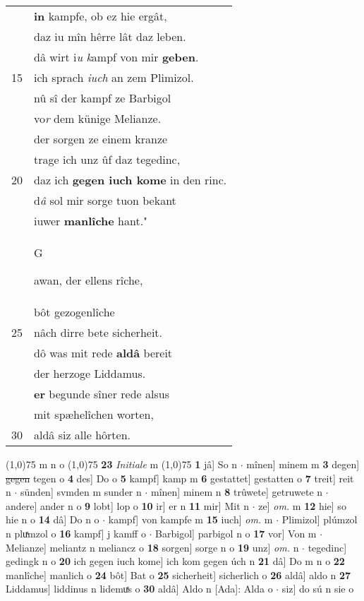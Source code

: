 \documentclass[8pt,a4paper,notitlepage]{article}
\begin{document}
\begin{table}[ht]
\begin{minipage}[t]{0.5\linewidth}
\begin{tabular}{rl}
 & \textbf{in} kampfe, ob ez  hie ergât,\\ 
 & daz iu mîn hêrre lât daz leben.\\ 
 & dâ wirt i\textit{u} \textit{k}ampf von mir \textbf{geben}.\\ 
15 & ich sprach \textit{iuch} an zem Plimizol.\\ 
 & nû sî der kampf ze Barbigol\\ 
 & vo\textit{r} dem künige Melianze.\\ 
 & der sorgen ze einem kranze\\ 
 & trage ich unz ûf daz tegedinc,\\ 
20 & daz ich \textbf{gegen iuch kome} in den rinc.\\ 
 & d\textit{â} sol mir sorge tuon bekant\\ 
 & iuwer \textbf{manlîche} hant."\\ 
 & \begin{large}G\end{large}awan, der ellens rîche,\\ 
 & bôt gezogenlîche\\ 
25 & nâch dirre bete sicherheit.\\ 
 & dô was mit rede \textbf{aldâ} bereit\\ 
 & der herzoge Liddamus.\\ 
 & \textbf{er} begunde sîner rede alsus\\ 
 & mit spæhelîchen worten,\\ 
30 & aldâ siz alle hôrten.\\ 
\end{tabular}
\scriptsize
\line(1,0){75} \newline
m n o \newline
\line(1,0){75} \newline
\textbf{23} \textit{Initiale} m  \newline
\line(1,0){75} \newline
\textbf{1} jâ] So n  $\cdot$ mînen] minem m \textbf{3} degen] \sout{gegen} tegen o \textbf{4} des] Do o \textbf{5} kampf] kamp m \textbf{6} gestattet] gestatten o \textbf{7} treit] reit n  $\cdot$ sünden] svmden m sunder n  $\cdot$ mînen] minem n \textbf{8} trûwete] getruwete n  $\cdot$ andere] ander n o \textbf{9} lobt] lop o \textbf{10} ir] er n \textbf{11} mir] Mit n  $\cdot$ ze] \textit{om.} m \textbf{12} hie] so hie n o \textbf{14} dâ] Do n o  $\cdot$ kampf] von kampfe m \textbf{15} iuch] \textit{om.} m  $\cdot$ Plimizol] plúmzol n pluͯmzol o \textbf{16} kampf] j kamff o  $\cdot$ Barbigol] parbigol n o \textbf{17} vor] Von m  $\cdot$ Melianze] meliantz n meliancz o \textbf{18} sorgen] sorge n o \textbf{19} unz] \textit{om.} n  $\cdot$ tegedinc] gedingk n o \textbf{20} ich gegen iuch kome] ich kom gegen úch n \textbf{21} dâ] Do m n o \textbf{22} manlîche] manlich o \textbf{24} bôt] Bat o \textbf{25} sicherheit] sicherlich o \textbf{26} aldâ] aldo n \textbf{27} Liddamus] liddinus n lidemuͯs o \textbf{30} aldâ] Aldo n [Ada]: Alda o  $\cdot$ siz] do sú n sie o \newline
\end{minipage}
\end{table}
\end{document}
